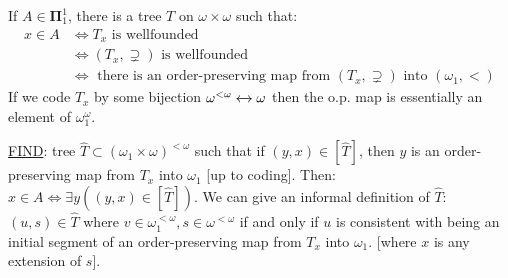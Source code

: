 \documentclass[]{article}
\newcommand{\om}{\omega}
\newcommand{\lom}{{<\omega}}
\newcommand{\bopi}{\bm{\Pi}}
\begin{document}
\begin{remark*}[Roadmap]
    If $A \in \bopi^1_1$, there is a tree $T$ on $\om\times\om$ such that:
    \begin{align*}
        x \in A &\iff T_x \textrm{ is wellfounded}\\
        &\iff (T_x,\supsetneq)\textrm{ is wellfounded}\\
        &\iff \textrm{ there is an order-preserving map from }(T_x,\supsetneq)\textrm{ into }(\om_1,<)
    \end{align*}
    If we code $T_x$ by some bijection $\om^\lom \xleftrightarrow{} \om$ then the o.p. map is essentially an element of $\om_1^\om$.

    \underline{FIND}: tree $\hat{T}\subset (\om_1\times\om)^\lom$ such that if $(y,x)\in [\hat{T}]$, then $y$ is an order-preserving map from $T_x$ into $\om_1$ [up to coding]. Then: $x \in A \iff \exists y((y,x)\in[\hat{T}])$. We can give an informal definition of $\hat{T}$: $(u,s)\in \hat{T}$ where $v \in \om_1^\lom,s\in\om^\lom$ if and only if $u$ is consistent with being an initial segment of an order-preserving map from $T_x$ into $\om_1$. [where $x$ is any extension of $s$].
\end{remark*}
\end{document}

